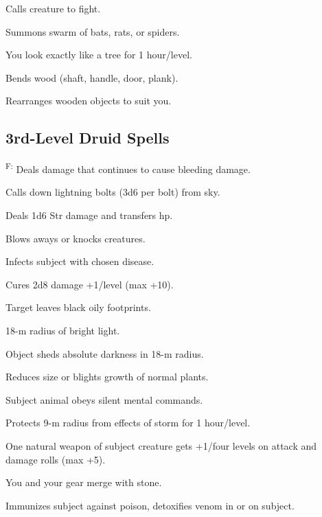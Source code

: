  Calls creature to fight.

 Summons swarm of bats, rats, or spiders.

 You look exactly like a tree for 1 hour/level.

 Bends wood (shaft, handle, door, plank).

 Rearranges wooden objects to suit you.



\subsection{3rd-Level Druid Spells}

\textsuperscript{F:} Deals damage that continues to cause bleeding damage.%

 Calls down lightning bolts (3d6 per bolt) from sky.

 Deals 1d6 Str damage and transfers hp.

 Blows aways or knocks creatures.

 Infects subject with chosen disease.

 Cures 2d8 damage +1/level (max +10).

 Target leaves black oily footprints.%

 18-m radius of bright light.

 Object sheds absolute darkness in 18-m radius.

 Reduces size or blights growth of normal plants.

 Subject animal obeys silent mental commands.

 Protects 9-m radius from effects of storm for 1 hour/level.%

 One natural weapon of subject creature gets +1/four levels on attack and damage rolls (max +5).

 You and your gear merge with stone.

 Immunizes subject against poison, detoxifies venom in or on subject.

